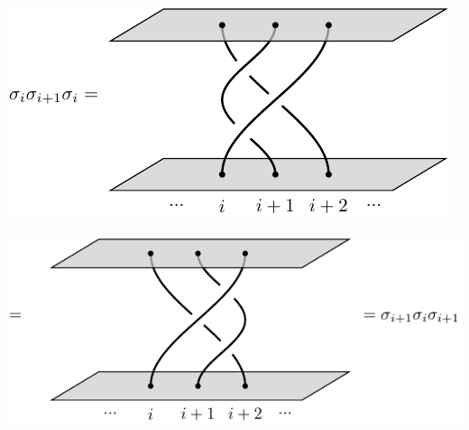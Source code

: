 \includegraphics[]{pic-braid-YB-0.pdf}\\

\ \ \ \ \ \ \ \ \ \ \ \ \ \ \ \ \ \ \ \ \ \ \ \includegraphics[]{pic-braid-YB-1.pdf}

